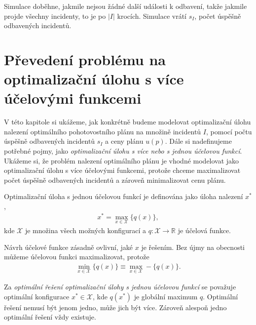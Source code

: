 Simulace doběhne, jakmile nejsou žádné další události k odbavení, takže jakmile projde všechny incidenty, to je po $|I|$ krocích.
Simulace vrátí $s_I$, počet úspěšně odbavených incidentů.

\section{Převedení problému na optimalizační úlohu s více účelovými funkcemi}\label{kap:optUloha2uc}

V této kapitole si ukážeme, jak konkrétně budeme modelovat optimalizační úlohu nalezení optimálního pohotovostního plánu na množině incidentů $I$,
pomocí počtu úspěšně odbavených incidentů $s_I$ a ceny plánu $u(p)$.
Dále si nadefinujeme potřebné pojmy, jako \textit{optimalizační úlohu s více nebo s jednou účelovou funkcí}.
Ukážeme si, že problém nalezení optimálního plánu je vhodné modelovat jako optimalizační úlohu s více účelovými funkcemi,
protože chceme maximalizovat počet úspěšně odbavených incidentů a zároveň minimalizovat cenu plánu.

\begin{definice}\label{df:optUloha1ucObecne}
  Optimalizační úloha s jednou účelovou funkcí je definována jako úloha nalezení $x^*$,
  \begin{align}
    x^* = \max_{x \in \mathcal{X}} \{ q(x) \},
  \end{align}
  kde $\mathcal{X}$ je množina všech možných konfigurací a $q \colon \mathcal{X} \rightarrow \mathbb{R}$ je účelová funkce.
\end{definice}

Návrh účelové funkce zásadně ovlivní, jaké $x$ je řešením.
Bez újmy na obecnosti můžeme účelovou funkci maximalizovat, protože
\begin{align*}
  \min_{x \in \mathcal{X}} \{ q(x) \} \equiv \max_{x \in \mathcal{X}} - \{ q(x) \}.
\end{align*}

Za \textit{optimální řešení optimalizační úlohy s jednou účelovou funkcí} se považuje optimální konfigurace $x^* \in \mathcal{X}$,
kde $q(x^*)$ je globální maximum $q$.
Optimální řešení nemusí být jenom jedno, může jich být více. Zároveň alespoň jedno optimální řešení vždy existuje.


